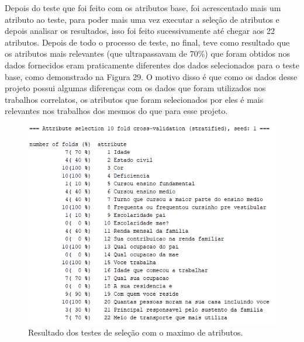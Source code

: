 \par
\textcolor{red}{}

\par
\textcolor{red}{}

\par
\textcolor{red}{}

\par
\textcolor{red}{}

\par
Depois do teste que foi feito com os atributos base, foi acrescentado mais um atributo ao teste, para poder mais uma vez executar a seleção de atributos e depois analisar os resultados, isso foi feito sucessivamente até chegar aos 22 atributos. Depois de todo o processo de teste, no final, teve como resultado que os atributos mais relevantes (que ultrapassavam de 70\%) que foram obtidos nos dados fornecidos eram praticamente diferentes dos dados selecionados para o teste base, como demonstrado na Figura 29. O motivo disso é que  como os dados desse projeto possui algumas diferenças com os dados que foram utilizados nos trabalhos correlatos, os atributos que foram selecionados por eles é mais relevantes nos trabalhos dos mesmos do que para esse projeto.

\par
\begin{figure}[!htp]
	\begin{center}
    \caption{\label{fig:waveform_fig} Resultado dos testes de seleção com o maximo de atributos.}
	\includegraphics[scale=0.90]{Figuras/22_atributos.png}
	\end{center}
\end{figure}

